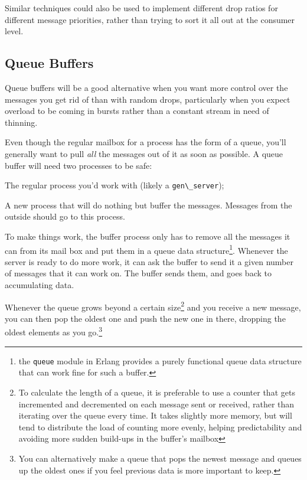 \documentclass[11pt, oneside]{book}   	%
\newcommand{\module}[1]{\Verb`#1`}
\begin{document}
Similar techniques could also be used to implement different drop ratios for different message priorities, rather than trying to sort it all out at the consumer level.

\subsection{Queue Buffers}

Queue buffers will be a good alternative when you want more control over the messages you get rid of than with random drops, particularly when you expect overload to be coming in bursts rather than a constant stream in need of thinning.

Even though the regular mailbox for a process has the form of a queue, you'll generally want to pull \emph{all} the messages out of it as soon as possible. A queue buffer will need two processes to be safe:

\begin{itemize*}
	\item The regular process you'd work with (likely a \module{gen\_server});
	\item A new process that will do nothing but buffer the messages. Messages from the outside should go to this process.
\end{itemize*}

To make things work, the buffer process only has to remove all the messages it can from its mail box and put them in a queue data structure\footnote{the \module{queue} module in Erlang provides a purely functional queue data structure that can work fine for such a buffer.}. Whenever the server is ready to do more work, it can ask the buffer to send it a given number of messages that it can work on. The buffer sends them, and goes back to accumulating data.


Whenever the queue grows beyond a certain size\footnote{To calculate the length of a queue, it is preferable to use a counter that gets incremented and decremented on each message sent or received, rather than iterating over the queue every time. It takes slightly more memory, but will tend to distribute the load of counting more evenly, helping predictability and avoiding more sudden build-ups in the buffer's mailbox} and you receive a new message, you can then pop the oldest one and push the new one in there, dropping the oldest elements as you go.\footnote{You can alternatively make a queue that pops the newest message and queues up the oldest ones if you feel previous data is more important to keep.}
\end{document}
